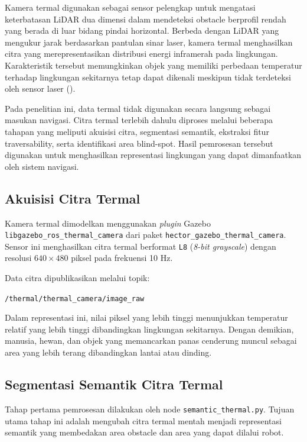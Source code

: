 Kamera termal digunakan sebagai sensor pelengkap untuk mengatasi keterbatasan LiDAR dua dimensi dalam mendeteksi obstacle berprofil rendah yang berada di luar bidang pindai horizontal. Berbeda dengan LiDAR yang mengukur jarak berdasarkan pantulan sinar laser, kamera termal menghasilkan citra yang merepresentasikan distribusi energi inframerah pada lingkungan. Karakteristik tersebut memungkinkan objek yang memiliki perbedaan temperatur terhadap lingkungan sekitarnya tetap dapat dikenali meskipun tidak terdeteksi oleh sensor laser (\cite{Castro2016,Choi2023}).

Pada penelitian ini, data termal tidak digunakan secara langsung sebagai masukan navigasi. Citra termal terlebih dahulu diproses melalui beberapa tahapan yang meliputi akuisisi citra, segmentasi semantik, ekstraksi fitur traversability, serta identifikasi area blind-spot. Hasil pemrosesan tersebut digunakan untuk menghasilkan representasi lingkungan yang dapat dimanfaatkan oleh sistem navigasi.

\subsection{Akuisisi Citra Termal}

Kamera termal dimodelkan menggunakan \textit{plugin} Gazebo \texttt{libgazebo\_ros\_thermal\_c\-amera} dari paket \texttt{hector\_gazebo\_thermal\_camera}. Sensor ini menghasilkan citra termal berformat \texttt{L8} (\textit{8-bit grayscale}) dengan resolusi $640 \times 480$ piksel pada frekuensi 10 Hz.

Data citra dipublikasikan melalui topik:

\begin{center}
\texttt{/thermal/thermal\_camera/image\_raw}
\end{center}

Dalam representasi ini, nilai piksel yang lebih tinggi menunjukkan temperatur relatif yang lebih tinggi dibandingkan lingkungan sekitarnya. Dengan demikian, manusia, hewan, dan objek yang memancarkan panas cenderung muncul sebagai area yang lebih terang dibandingkan lantai atau dinding.

\subsection{Segmentasi Semantik Citra Termal}

Tahap pertama pemrosesan dilakukan oleh node \texttt{semantic\_thermal.py}. Tujuan utama tahap ini adalah mengubah citra termal mentah menjadi representasi semantik yang membedakan area obstacle dan area yang dapat dilalui robot.

